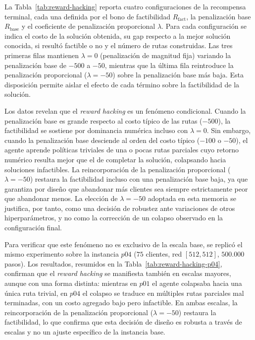 
La Tabla~\ref{tab:reward-hacking} reporta cuatro configuraciones de la recompensa terminal, cada una definida por el bono de factibilidad $R_{\text{fact}}$, la penalización base $R_{\text{base}}$ y el coeficiente de penalización proporcional $\lambda$. Para cada configuración se indica el costo de la solución obtenida, su gap respecto a la mejor solución conocida, si resultó factible o no y el número de rutas construidas. Las tres primeras filas mantienen $\lambda = 0$ (penalización de magnitud fija) variando la penalización base de $-500$ a $-50$, mientras que la última fila reintroduce la penalización proporcional ($\lambda = -50$) sobre la penalización base más baja. Esta disposición permite aislar el efecto de cada término sobre la factibilidad de la solución.

Los datos revelan que el \textit{reward hacking} es un fenómeno condicional. Cuando la penalización base es grande respecto al costo típico de las rutas ($-500$), la factibilidad se sostiene por dominancia numérica incluso con $\lambda = 0$. Sin embargo, cuando la penalización base desciende al orden del costo típico ($-100$ o $-50$), el agente aprende políticas triviales de una o pocas rutas parciales cuyo retorno numérico resulta mejor que el de completar la solución, colapsando hacia soluciones infactibles. La reincorporación de la penalización proporcional ($\lambda = -50$) restaura la factibilidad incluso con una penalización base baja, ya que garantiza por diseño que abandonar más clientes sea siempre estrictamente peor que abandonar menos. La elección de $\lambda = -50$ adoptada en esta memoria se justifica, por tanto, como una decisión de robustez ante variaciones de otros hiperparámetros, y no como la corrección de un colapso observado en la configuración final.


Para verificar que este fenómeno no es exclusivo de la escala base, se replicó el mismo experimento sobre la instancia $p04$ ($75$ clientes, red $[512,512]$, $500.000$ pasos). Los resultados, resumidos en la Tabla~\ref{tab:reward-hacking-p04}, confirman que el \textit{reward hacking} se manifiesta también en escalas mayores, aunque con una forma distinta: mientras en $p01$ el agente colapsaba hacia una única ruta trivial, en $p04$ el colapso se traduce en múltiples rutas parciales mal terminadas, con un costo agregado bajo pero infactible. En ambas escalas, la reincorporación de la penalización proporcional ($\lambda = -50$) restaura la factibilidad, lo que confirma que esta decisión de diseño es robusta a través de escalas y no un ajuste específico de la instancia base. 


